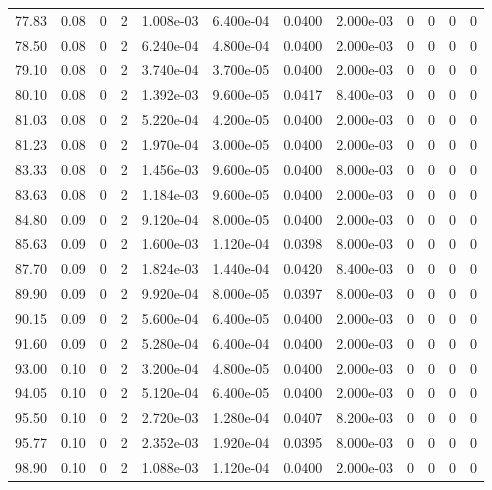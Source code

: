\documentclass[preview]{standalone}
\begin{document}
{{{{\begin{tabular}{L{1.2cm}C{1.2cm} C{0.3cm}C{0.5cm} C{1.4cm}C{1.4cm} C{1.4cm}C{1.4cm} C{1.6cm}C{1.6cm} C{1.6cm}C{1.6cm}}
  77.83  &  0.08  & 0     &  2 &  1.008e-03  & 6.400e-04  &  0.0400&   2.000e-03& 0 & 0   &  0 & 0  \\ 
  78.50  &  0.08  & 0     &  2 &  6.240e-04  & 4.800e-04  &  0.0400&   2.000e-03& 0 & 0   &  0 & 0  \\ 
  79.10  &  0.08  & 0     &  2 &  3.740e-04  & 3.700e-05  &  0.0400&   2.000e-03& 0 & 0   &  0 & 0  \\ 
  80.10  &  0.08  & 0     &  2 &  1.392e-03  & 9.600e-05  &  0.0417&   8.400e-03& 0 & 0   &  0 & 0  \\ 
  81.03  &  0.08  & 0     &  2 &  5.220e-04  & 4.200e-05  &  0.0400&   2.000e-03& 0 & 0   &  0 & 0  \\ 
  81.23  &  0.08  & 0     &  2 &  1.970e-04  & 3.000e-05  &  0.0400&   2.000e-03& 0 & 0   &  0 & 0  \\ 
  83.33  &  0.08  & 0     &  2 &  1.456e-03  & 9.600e-05  &  0.0400&   8.000e-03& 0 & 0   &  0 & 0  \\ 
  83.63  &  0.08  & 0     &  2 &  1.184e-03  & 9.600e-05  &  0.0400&   2.000e-03& 0 & 0   &  0 & 0  \\ 
  84.80  &  0.09  & 0     &  2 &  9.120e-04  & 8.000e-05  &  0.0400&   2.000e-03& 0 & 0   &  0 & 0  \\ 
  85.63  &  0.09  & 0     &  2 &  1.600e-03  & 1.120e-04  &  0.0398&   8.000e-03& 0 & 0   &  0 & 0  \\ 
  87.70  &  0.09  & 0     &  2 &  1.824e-03  & 1.440e-04  &  0.0420&   8.400e-03& 0 & 0   &  0 & 0  \\ 
  89.90  &  0.09  & 0     &  2 &  9.920e-04  & 8.000e-05  &  0.0397&   8.000e-03& 0 & 0   &  0 & 0  \\ 
  90.15  &  0.09  & 0     &  2 &  5.600e-04  & 6.400e-05  &  0.0400&   2.000e-03& 0 & 0   &  0 & 0  \\ 
  91.60  &  0.09  & 0     &  2 &  5.280e-04  & 6.400e-04  &  0.0400&   2.000e-03& 0 & 0   &  0 & 0  \\ 
  93.00  &  0.10  & 0     &  2 &  3.200e-04  & 4.800e-05  &  0.0400&   2.000e-03& 0 & 0   &  0 & 0  \\ 
  94.05  &  0.10  & 0     &  2 &  5.120e-04  & 6.400e-05  &  0.0400&   2.000e-03& 0 & 0   &  0 & 0  \\ 
  95.50  &  0.10  & 0     &  2 &  2.720e-03  & 1.280e-04  &  0.0407&   8.200e-03& 0 & 0   &  0 & 0  \\ 
  95.77  &  0.10  & 0     &  2 &  2.352e-03  & 1.920e-04  &  0.0395&   8.000e-03& 0 & 0   &  0 & 0  \\ 
  98.90  &  0.10  & 0     &  2 &  1.088e-03  & 1.120e-04  &  0.0400&   2.000e-03& 0 & 0   &  0 & 0  \\ 

\end{tabular}}}}}
\end{document}
